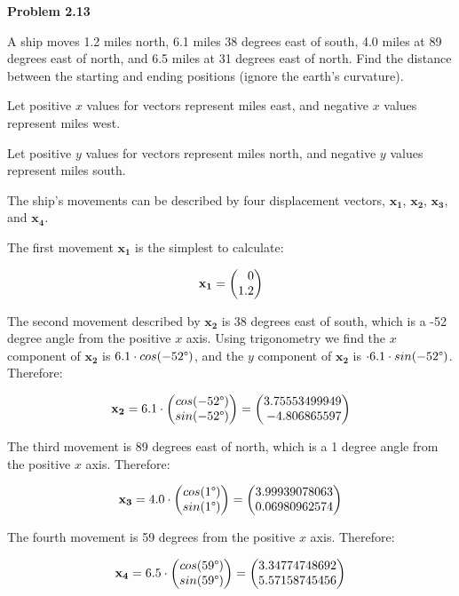 \documentclass[12pt]{article}
\newenvironment{problem}[1][default]{
  \begin{framed}\begin{minipage}{0.97\textwidth}
  \setlength{\parskip}{4mm}
  {\bf Problem #1}
}{\end{minipage}\end{framed}}
\newcommand\m[2][]{
	\ifthenelse{\equal {#1} {}}
		{\begin{pmatrix*}[r]#2\end{pmatrix*}}
		{\left(\begin{array}{#1}#2\end{array}\right)}
}
\renewcommand{\vec}[1]{\mathbf{#1}}
\begin{document}
\begin{problem}[2.13]
	A ship moves 1.2 miles north, 6.1 miles 38 degrees east of south, 4.0 
	miles at 89 degrees east of north, and 6.5 miles at 31 degrees east of north. 
	Find the distance between the starting and ending positions (ignore the earth's 
	curvature).
\end{problem}

Let positive $x$ values for vectors represent miles east, and negative $x$ values represent miles west.

Let positive $y$ values for vectors represent miles north, and negative $y$ values represent miles south.

The ship's movements can be described by four displacement vectors, $\vec{x_1}$, $\vec{x_2}$, $\vec{x_3}$, and $\vec{x_4}$.

The first movement $\vec{x_1}$ is the simplest to calculate:

\begin{equation}
	\vec{x_1} = \m{0 \\ 1.2}
\end{equation}

The second movement described by $\vec{x_2}$ is 38 degrees east of south, which is a 
-52 degree angle from the positive $x$ axis. Using trigonometry we find the $x$ 
component of $\vec{x_2}$ is $6.1 \cdot cos(-52\degree)$, and the $y$ component of 
$\vec{x_2}$ is $\cdot 6.1 \cdot sin(-52\degree)$. Therefore:

\begin{equation}
	\vec{x_2} = 6.1 \cdot \m{cos(-52\degree) \\ sin(-52\degree)} = \m{3.75553499949 \\ -4.806865597}
\end{equation}

The third movement is 89 degrees east of north, which is a 1 degree angle from 
the positive $x$ axis. Therefore:

\begin{equation}
	\vec{x_3} = 4.0 \cdot \m{cos(1\degree) \\ sin(1\degree)} = \m{3.99939078063 \\ 0.06980962574}
\end{equation}

The fourth movement is 59 degrees from the positive $x$ axis. Therefore:

\begin{equation}
	\vec{x_4} = 6.5 \cdot \m{cos(59\degree) \\ sin(59\degree)} = \m{3.34774748692 \\ 5.57158745456}
\end{equation}
\end{document}
